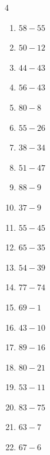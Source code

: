 \begin{multicols}{4}
\begin{enumerate}
  \item $58-55$
        \phantom{$=3$}

  \item $50-12$
        \phantom{$=38$}

  \item $44-43$
        \phantom{$=1$}

  \item $56-43$
        \phantom{$=13$}

  \item $80-8$
        \phantom{$=72$}

  \item $55-26$
        \phantom{$=29$}

  \item $38-34$
        \phantom{$=4$}

  \item $51-47$
        \phantom{$=4$}

  \item $88-9$
        \phantom{$=79$}

  \item $37-9$
        \phantom{$=28$}

  \item $55-45$
        \phantom{$=10$}

\columnbreak %

  \item $65-35$
        \phantom{$=30$}

  \item $54-39$
        \phantom{$=15$}

  \item $77-74$
        \phantom{$=3$}

  \item $69-1$
        \phantom{$=68$}

  \item $43-10$
        \phantom{$=33$}

  \item $89-16$
        \phantom{$=73$}

  \item $80-21$
        \phantom{$=59$}

  \item $53-11$
        \phantom{$=42$}

  \item $83-75$
        \phantom{$=8$}

  \item $63-7$
        \phantom{$=56$}

  \item $67-6$
        \phantom{$=61$}


\end{enumerate}
\end{multicols}
